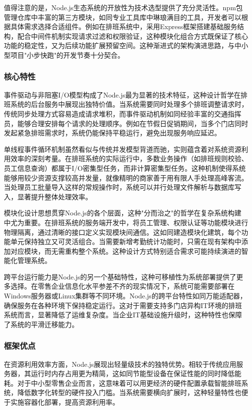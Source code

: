 \documentclass{ctexart}
\begin{document}
值得注意的是，Node.js生态系统的开放性为技术选型提供了充分灵活性。npm包管理仓库中丰富的第三方模块，如同专业工具库中琳琅满目的工具，开发者可以根据具体需求选择合适组件。例如在排班系统中，采用Express框架搭建基础服务结构，配合中间件机制实现请求过滤和权限验证，这种模块化组合方式既保证了核心功能的稳定性，又为后续功能扩展预留空间。这种渐进式的架构演进思路，与中小型项目"小步快跑"的开发节奏十分契合。

\subsubsection{核心特性}
事件驱动与非阻塞I/O模型构成了Node.js最为显著的技术特征，这种设计哲学在排班系统的后台服务中展现出独特价值。当系统需要同时处理多个排班调整请求时，传统同步处理方式容易造成请求堆积，而事件驱动机制如同经验丰富的交通指挥员，能够合理安排每个请求的处理顺序。例如在节假日促销期间，当多个门店同时发起紧急排班需求时，系统仍能保持平稳运行，避免出现服务响应延迟。

单线程事件循环机制虽然看似与传统并发模型背道而驰，实则蕴含着对系统资源利用效率的深刻考量。在排班系统的实际运行中，多数业务操作（如排班规则校验、员工信息查询）都属于I/O密集型任务，而非计算密集型任务。这种机制使得系统能够用较少资源支撑较高并发量，就像精明的商家善于用有限人手处理高峰客流。当处理员工批量导入这样的常规操作时，系统可以并行处理文件解析与数据库写入，显著提升整体处理效率。

模块化设计思想贯穿Node.js的各个层面，这种"分而治之"的哲学在复杂系统构建中尤为重要。在排班系统的服务端开发中，将员工管理、权限认证等功能模块进行物理隔离，通过清晰的接口定义实现模块间通信。这如同建造模块化建筑，每个功能单元保持独立又可灵活组合。当需要新增考勤统计功能时，只需在现有架构中添加对应模块，而无需重构整个系统。这种设计方式特别适合需求可能持续演进的智能化管理系统。

跨平台运行能力是Node.js的另一个基础特性，这种可移植性为系统部署提供了更多选择。在零售企业信息化水平参差不齐的现实情况下，系统可能需要部署在Windows服务器或Linux集群等不同环境。Node.js的跨平台特性如同万能适配器，确保服务在各种环境下保持稳定运行。这对于需要支持多门店异构IT环境的排班系统而言，显著降低了运维复杂度。当企业IT基础设施升级时，这种特性也保障了系统的平滑迁移能力。

\subsubsection{框架优点}
在资源利用效率方面，Node.js展现出轻量级技术的独特优势。相较于传统应用服务器，其运行时内存占用更为精简，这如同节能型设备在保证性能的同时降低能耗。对于中小型零售企业而言，这意味着可以用更经济的硬件配置承载智能排班系统，降低数字化转型的硬件投入门槛。当系统需要横向扩展时，这种轻量特性也便于实施容器化部署，提高资源利用率。
\end{document}
